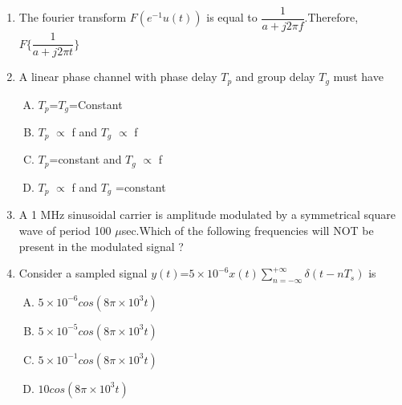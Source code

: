 \documentclass[journal,12pt,twocolumn]{IEEEtran}
\begin{document}
\begin{enumerate}
\item The fourier transform $F(e^{-1}u(t))$ is equal to $\dfrac{1}{a+j2\pi f}$.Therefore,$F\{\dfrac{1}{a+j2\pi t}\}$\\
\begin{enumerate}[(A)]
\end{enumerate}

\item A linear phase channel with phase delay $T_p$ and group delay $T_g$ must have \\
\begin{enumerate}[(A)]
\setlength\itemsep{2.5em}

\item $T_p$=$T_g$=Constant
\item $T_p$ $\propto$ f and $T_g$ $\propto$ f
\item $T_p$=constant and $T_g$ $\propto$ f
\item $T_p$ $\propto$ f and $T_g$  =constant

\end{enumerate}

\item A 1 MHz sinusoidal carrier is amplitude modulated by a symmetrical square wave of period 100 $\mu$sec.Which of the following frequencies will NOT be present in the modulated signal ? \\
\begin{enumerate}[(A)]
\end{enumerate}

\item Consider a sampled signal $y(t)$=$5\times10^{-6} x(t)\sum\limits_{n=-\infty}^{+\infty}\delta(t-nT_s)$ is \\
\begin{enumerate}[(A)]
\setlength\itemsep{2em}
\item $
5\times10^{-6} cos(8\pi\times10^{3}t)
$
\item $
5\times10^{-5} cos(8\pi\times10^{3}t)
$
\item $
5\times10^{-1} cos(8\pi\times10^{3}t)
$
\item $
10cos(8\pi\times10^{3}t)
$


\end{enumerate}
\end{enumerate}
\end{document}
